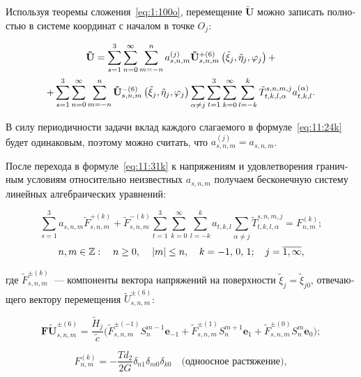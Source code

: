 \begin{russian}
Используя теоремы сложения~\eqref{eq:1:100o}, перемещение $\mathbf{\tilde U}$ можно записать полностью в системе координат с началом в точке $O_j$:

\begin{multline}
{\bf{\tilde U}} = \sum\limits_{s = 1}^3 {\sum\limits_{n = 0}^\infty  {\sum\limits_{m =  - n }^{n } {a_{s,n,m}^{(j)}} } } {\bf{\tilde U}}_{s,n,m}^{ +(6)}\left( {{\tilde\xi_j},{\tilde\eta _j},{\varphi _j}} \right) + \\
+ \sum\limits_{s=1}^3\sum\limits_{n = 0}^\infty\sum\limits_{m =  - n }^{n }{\bf{\tilde U}}_{s,n,m}^{ - (6)}\left( {{\tilde\xi_j},{\tilde\eta _j},{\varphi _j}} \right)\sum\limits_{\alpha  \ne j}\sum\limits_{t=1}^3\sum\limits_{k = 0}^\infty\mathop \sum \limits_{l =  - k}^{k}\tilde T_{t,k,l,\alpha}^{s,n,m,j}a_{t,k,l}^{(\alpha)}.
\label{eq:11:31k}
\end{multline}

В силу периодичности задачи вклад каждого слагаемого в формуле~\eqref{eq:11:24k} будет одинаковым, поэтому можно считать, что $a_{s,n,m}^{(j)}=a_{s,n,m}$.

После перехода в формуле~\eqref{eq:11:31k} к напряжениям и удовлетворения граничным условиям относительно неизвестных $a_{s,n,m}$ получаем бесконечную систему линейных алгебраических уравнений:

\begin{equation}
\sum\limits_{s=1}^3 a_{s,n,m}\tilde F_{s,n,m}^{+(k)}+\tilde F_{s,n,m}^{-(k)}\sum\limits_{t=1}^3\sum\limits_{k=0}^\infty\sum\limits_{l=-k}^k a_{t,k,l}\sum\limits_{\alpha\neq j}\tilde T_{t,k,l,\alpha}^{s,n,m,j}=F_{n,m}^{(k)};
\label{eq:11:32k}
\end{equation}
$$
n,m \in\mathbb{Z}:\quad n \ge 0,{\mkern 1mu} \quad {\kern 1pt} |m| \le n,\quad {\mkern 1mu} k =  - 1,{\mkern 1mu} {\kern 1pt} 0,{\mkern 1mu} {\kern 1pt} 1;\;\;\;{\mkern 1mu} {\kern 1pt} j = \overline {1,\infty},
$$

\noindent где $\tilde F_{s,n,m}^{\pm(k)}$~--- компоненты вектора напряжений на поверхности $\tilde\xi_j=\tilde\xi_{j0}$, отвечающего вектору перемещения $\tilde U_{s,n,m}^{\pm(6)}$:

$$
\mathbf{F\tilde U}_{s,n,m}^{\pm(6)}=\frac{\tilde H_j}{\tilde c}\bigg(\tilde F_{s,n,m}^{\pm(-1)}S_n^{m-1}\mathbf{e}_{-1}+\tilde F_{s,n,m}^{\pm(1)}S_n^{m+1}\mathbf{e}_1+\tilde F_{s,n,m}^{\pm(0)}S_n^m\mathbf{e}_0\bigg);
$$

\begin{equation*}
F_{n,m}^{(k)} =  -\frac{Td_2}{2G}{\delta _{n1}}{\delta _{m0}}{\delta _{k0}}\quad\text{(одноосное растяжение)},
\end{equation*}


\end{russian}
